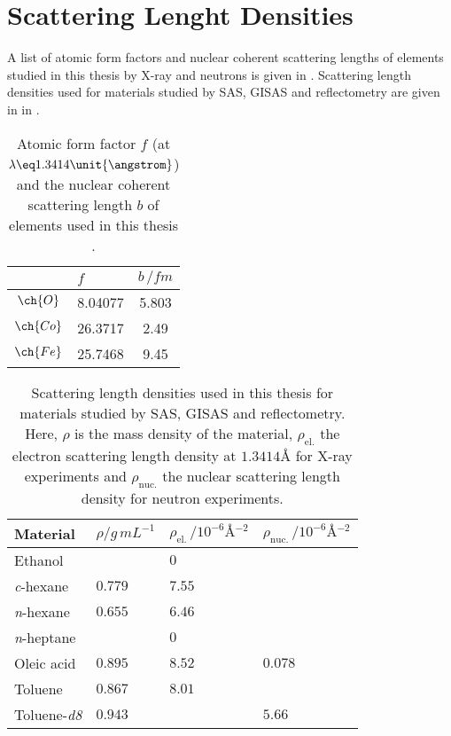\documentclass[\main/dresen_thesis.tex]{subfiles}
\begin{document}
  \chapter{Scattering Lenght Densities}
  \label{appendix:slds}
  A list of atomic form factors and nuclear coherent scattering lengths of elements studied in this thesis by X-ray and neutrons is given in .
  Scattering length densities used for materials studied by SAS, GISAS and reflectometry are given in in .

  \begin{table}[ht]
    \centering
    \caption{\label{tab:appendix:affNuc}Atomic form factor $f$ (at $\lambda \eq 1.3414 \unit{\angstrom}$) and the nuclear coherent scattering length $b$ of elements used in this thesis \cite{Sears_1992_Neutr, BerkeleyLab_1993_asf}.}
    \begin{tabular}{ c | l | c }
                & $f$       & $b \, / \unit{fm}$ \\
      \hline
      $\ch{O}$  & 8.04077   & 5.803   \\
      $\ch{Co}$ & 26.3717   & 2.49  \\
      $\ch{Fe}$ & 25.7468   & 9.45  \\
      \hline
    \end{tabular}
  \end{table}

  \begin{table}[!htbp]
    \centering
    \caption{\label{tab:appendix:slds}Scattering length densities used in this thesis for materials studied by SAS, GISAS and reflectometry. Here, $\rho$ is the mass density of the material, $\rho_\mathrm{el.}$ the electron scattering length density at $1.3414 \unit{\angstrom}$ for X-ray experiments and $\rho_\mathrm{nuc.}$ the nuclear scattering length density for neutron experiments.}
    \begin{tabular}{ l | l | l | l }
      \textbf{Material}  & $\rho / \unit{g \, mL^{-1}}$ & $\rho_\mathrm{el.} \, / \unit{10^{-6} \angstrom^{-2}}$ & $\rho_\mathrm{nuc.} \, / \unit{10^{-6} \angstrom^{-2}}$\\
      \hline
      Ethanol                  &                & $0$          & \\
      \textit{c}-hexane        & $0.779$        & $7.55$       & \\
      \textit{n}-hexane        & $0.655$        & $6.46$          & \\
      \textit{n}-heptane       &                & $0$          & \\
      Oleic acid               & $0.895$        & $8.52$       & $0.078$\\
      Toluene                  & $0.867$        & $8.01$       & \\
      Toluene-\textit{d8}      & $0.943$        &              & $5.66$\\
      \hline
    \end{tabular}
  \end{table}
\end{document}
